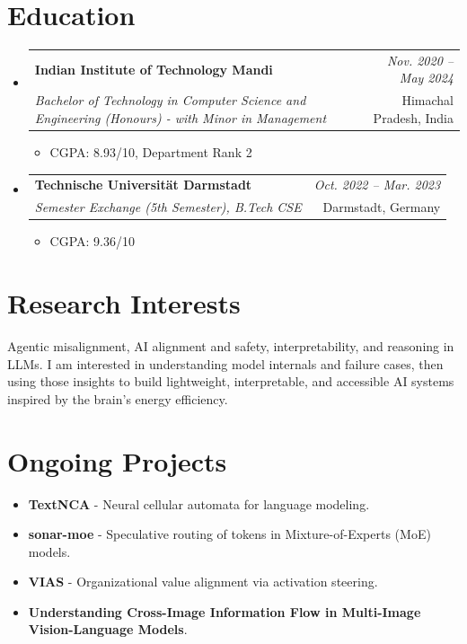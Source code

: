 \documentclass[a4paper,11pt]{article}
\makeatletter
\newcommand{\resumeSubheading}[4]{
\vspace{0.5mm}\item
    \begin{tabular*}{0.98\textwidth}[t]{l@{\extracolsep{\fill}}r}
        \textbf{#1} & \textit{\footnotesize{#4}} \\
        \textit{\footnotesize{#3}} &  \footnotesize{#2}\\
    \end{tabular*}
    \vspace{-2.4mm}
}
\newcommand{\resumeSubHeadingListStart}{\begin{itemize}[leftmargin=*,labelsep=1mm]}
\newcommand{\resumeItemListStart}{\begin{itemize}[leftmargin=*,labelsep=1mm,itemsep=0.5mm]}
\newcommand{\resumeSubHeadingListEnd}{\end{itemize}\vspace{2mm}}
\newcommand{\resumeItemListEnd}{\end{itemize}\vspace{-2mm}}
\makeatother
\begin{document}
\section{\textbf{Education}}
\vspace{0.5mm}
\resumeSubHeadingListStart

\resumeSubheading
  {Indian Institute of Technology Mandi}{Himachal Pradesh, India}
  {Bachelor of Technology in Computer Science and Engineering (Honours) - with Minor in Management}{Nov. 2020 -- May 2024}
  \resumeItemListStart
    \item \small{CGPA: 8.93/10, Department Rank 2}

  \resumeItemListEnd

\resumeSubheading
  {Technische Universität Darmstadt}{Darmstadt, Germany}
  {Semester Exchange (5th Semester), B.Tech CSE}{Oct. 2022 -- Mar. 2023}
  \resumeItemListStart
    \item \small{CGPA: 9.36/10}

  \resumeItemListEnd

\resumeSubHeadingListEnd
\vspace{-6.5mm}

\section{\textbf{Research Interests}}
\vspace{0.5mm}
\small{Agentic misalignment, AI alignment and safety, interpretability, and reasoning in LLMs. I am interested in understanding model internals and failure cases, then using those insights to build lightweight, interpretable, and accessible AI systems inspired by the brain's energy efficiency.}

\vspace{-2mm}

\section{\textbf{Ongoing Projects}}
\vspace{0.5mm}
\resumeItemListStart
  \item \textbf{TextNCA} - Neural cellular automata for language modeling.
  \item \textbf{sonar-moe} - Speculative routing of tokens in Mixture-of-Experts (MoE) models.
  \item \textbf{VIAS} - Organizational value alignment via activation steering.
  \item \textbf{Understanding Cross-Image Information Flow in Multi-Image Vision-Language Models}.
\resumeItemListEnd
\end{document}
